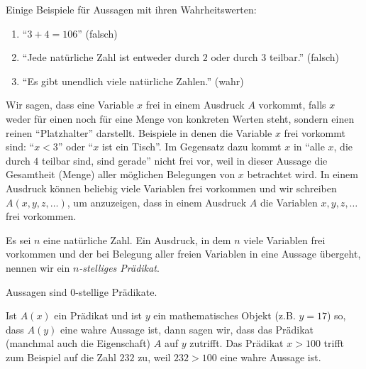 \begin{bsp}
 Einige Beispiele für Aussagen mit ihren Wahrheitswerten:
\begin{enumerate}
  \item ``$3+4=106$'' (falsch)
  \item ``Jede natürliche Zahl ist entweder durch $2$ oder durch $3$ teilbar.'' (falsch)
  \item ``Es gibt unendlich viele natürliche Zahlen.'' (wahr)
\end{enumerate}
\end{bsp}

\begin{rk}
Wir sagen, dass eine Variable $x$ frei in einem Ausdruck $A$ vorkommt, falls $x$ weder für einen noch für eine Menge von konkreten Werten steht, sondern einen reinen ``Platzhalter'' darstellt. Beispiele in denen die Variable $x$ frei vorkommt sind: ``$x<3$'' oder ``$x$ ist ein Tisch''. Im Gegensatz dazu kommt $x$ in ``alle $x$, die durch $4$ teilbar sind, sind gerade'' nicht frei vor, weil in dieser Aussage die Gesamtheit (Menge) aller möglichen Belegungen von $x$ betrachtet wird. In einem Ausdruck können beliebig viele Variablen frei vorkommen und wir schreiben $A(x,y,z,\dots)$, um anzuzeigen, dass in einem Ausdruck $A$ die Variablen $x,y,z,\dots$ frei vorkommen.
\end{rk}

\begin{df}
Es sei $n$ eine natürliche Zahl. Ein Ausdruck, in dem $n$ viele Variablen frei vorkommen und der bei Belegung aller freien Variablen in eine Aussage übergeht, nennen wir ein \textit{$n$-stelliges Prädikat}.
\end{df}

\begin{rk}
  Aussagen sind $0$-stellige Prädikate.
\end{rk}

\begin{rk}
  Ist $A(x)$ ein Prädikat und ist $y$ ein mathematisches Objekt (z.B. $y=17$) so, dass $A(y)$ eine wahre Aussage ist, dann sagen wir, dass das Prädikat (manchmal auch die Eigenschaft) $A$ auf $y$ zutrifft. Das Prädikat $x>100$ trifft zum Beispiel auf die Zahl $232$ zu, weil $232>100$ eine wahre Aussage ist.
\end{rk}

